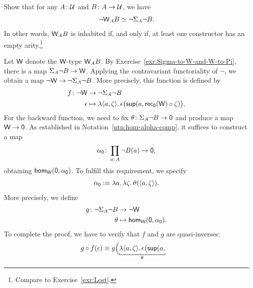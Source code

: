 \begin{exr}
    Show that for any $A\colon\univ$ and $B\colon A\to\univ$, we have
    \[
        \neg\mathsf{W}_AB\simeq\neg\Sigma_A\neg B.
    \]
    In other words, $\mathsf{W}_AB$ is inhabited if, and only if, at least one constructor has an empty arity.\footnote{Compare to Exercise~\ref{exr:Lost}.}
\end{exr}

\begin{solution}
    Let $\mathsf{W}$ denote the $\mathsf{W}$-type $\mathsf{W}_AB$. By Exercise~\ref{exr:Sigma-to-W-and-W-to-Pi}, there is a map $\Sigma_A\neg B\to\mathsf{W}$. Applying the contravariant functoriality of $\neg$, we obtain a map $\neg\mathsf{W}\to\neg\Sigma_A\neg B$. More precisely, this function is defined by
    \begin{align*}
        f\colon\neg\fun W&\to\neg\Sigma_A\neg B\\
        \epsilon&\mapsto
            \lambda\dep{a,\zeta}.\,
                \epsilon
                    \bigl(
                        \fun{sup}
                            (
                                a,
                                \fun{rec}_{\fun0}(\fun W)\circ\zeta
                            )
                    \bigr).
    \end{align*}
    For the backward function, we need to fix $\theta\colon\Sigma_A\neg B\to\fun0$ and produce a map $\mathsf{W}\to\mathsf{0}$. As established in Notation~\ref{ntn:hom-alpha-comp}, it suffices to construct a map
    \[
        \alpha_{\fun0}\colon\prod_{a\colon A}\neg B(a)\to\fun0,
    \]
    obtaining $\mathsf{hom}_{\mathsf{W}}(\mathsf{0},\alpha_{\mathsf{0}})$. To fulfill this requirement, we specify
    \[
        \alpha_{\mathsf{0}}\mathrel{\vcentcolon}\equiv
            \lambda a.\,\lambda\zeta.\,\theta(\langle a,\zeta\rangle).
    \]
    More precisely, we define
    \begin{align*}
        g\colon\neg\Sigma_A\neg B&\to\neg\fun W\\
        \theta&\mapsto\fun{hom}_{\fun W}(\fun0,\alpha_{\fun0}).
    \end{align*}
    To complete the proof, we have to verify that $f$ and $g$ are quasi-inverses:
    \begin{align*}
            g\circ f(\epsilon)
            &\equiv g
                    \Bigl(
                        \explain[\theta]
                        {
                            \lambda\dep{a,\zeta}.\,
                                \epsilon
                                \bigl(
                                    \fun{sup}(
                                        a,
}
\end{align*}
\end{solution}
